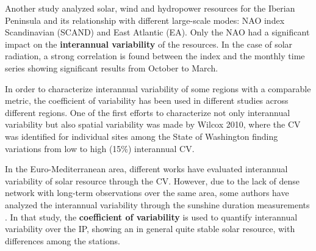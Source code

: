 Another study analyzed solar, wind and hydropower resources for the Iberian Peninsula and its relationship with different large-scale modes: NAO index Scandinavian (SCAND) and East Atlantic (EA). Only the NAO had a significant impact on the \textbf{interannual variability} of the resources. In the case of solar radiation, a strong correlation is found between the index and the monthly time series \cite*{Jerez2013a} showing significant results from October to March.

In order to characterize interannual variability of some regions with a comparable metric, the coefficient of variability has been used in different studies across different regions. One of the first efforts to characterize not only interannual variability but also spatial variability was made by Wilcox 2010, where the CV was identified for individual sites among the State of Washington finding variations from low to high (15$\%$) interannual CV.

In the Euro-Mediterranean area, different works have evaluated interannual variability of solar resource through the CV. However, due to the lack of dense network with long-term observations over the same area, some authors have analyzed the interannual variability through the sunshine duration measurements \cite*{Gil2015}. In that study, the \textbf{coefficient of variability} is used to quantify interannual variability over the IP, showing an in general quite stable solar resource, with differences among the stations. %




 

